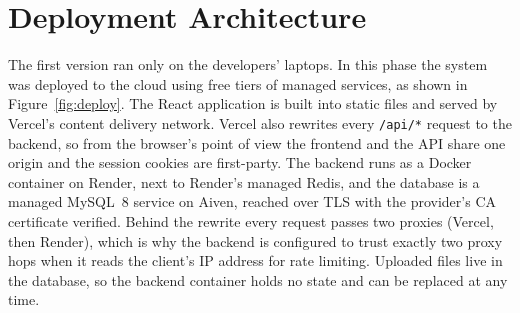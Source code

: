 \FloatBarrier
\section{Deployment Architecture}

The first version ran only on the developers' laptops. In this phase the system was deployed to the cloud using free tiers of managed services, as shown in Figure~\ref{fig:deploy}. The React application is built into static files and served by Vercel's content delivery network. Vercel also rewrites every \texttt{/api/*} request to the backend, so from the browser's point of view the frontend and the API share one origin and the session cookies are first-party. The backend runs as a Docker container on Render, next to Render's managed Redis, and the database is a managed MySQL~8 service on Aiven, reached over TLS with the provider's CA certificate verified. Behind the rewrite every request passes two proxies (Vercel, then Render), which is why the backend is configured to trust exactly two proxy hops when it reads the client's IP address for rate limiting. Uploaded files live in the database, so the backend container holds no state and can be replaced at any time.

